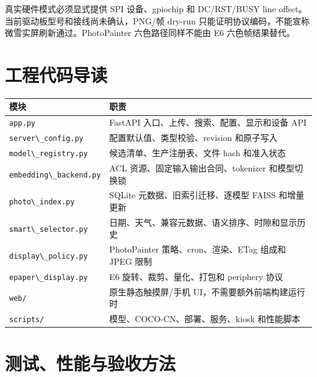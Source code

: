 真实硬件模式必须显式提供 SPI 设备、gpiochip 和 DC/RST/BUSY line
offset。当前驱动板型号和接线尚未确认，PNG/帧 dry-run
只能证明协议编码，不能宣称微雪实屏刷新通过。PhotoPainter
六色路径同样不能由 E6 六色帧结果替代。

\section{工程代码导读}\label{ux5de5ux7a0bux4ee3ux7801ux5bfcux8bfb}

\begin{longtable}[]{@{}
  >{\raggedright\arraybackslash}p{}
  >{\raggedright\arraybackslash}p{}@{}}
\toprule\noalign{}
\begin{minipage}[b]{\linewidth}\raggedright
模块
\end{minipage} & \begin{minipage}[b]{\linewidth}\raggedright
职责
\end{minipage} \\
\midrule\noalign{}
\endhead
\bottomrule\noalign{}
\endlastfoot
\passthrough{\lstinline!app.py!} & FastAPI
入口、上传、搜索、配置、显示和设备 API \\
\passthrough{\lstinline!server\_config.py!} &
配置默认值、类型校验、revision 和原子写入 \\
\passthrough{\lstinline!model\_registry.py!} &
候选清单、生产注册表、文件 hash 和准入状态 \\
\passthrough{\lstinline!embedding\_backend.py!} & ACL
资源、固定输入输出合同、tokenizer 和模型切换锁 \\
\passthrough{\lstinline!photo\_index.py!} & SQLite
元数据、旧索引迁移、逐模型 FAISS 和增量更新 \\
\passthrough{\lstinline!smart\_selector.py!} &
日期、天气、兼容元数据、语义排序、时隙和显示历史 \\
\passthrough{\lstinline!display\_policy.py!} & PhotoPainter
策略、cron、渲染、ETag 组成和 JPEG 限制 \\
\passthrough{\lstinline!epaper\_display.py!} & E6
旋转、裁剪、量化、打包和 periphery 协议 \\
\passthrough{\lstinline!web/!} & 原生静态触摸屏/手机
UI，不需要额外前端构建运行时 \\
\passthrough{\lstinline!scripts/!} & 模型、COCO-CN、部署、服务、kiosk
和性能脚本 \\
\end{longtable}

\section{测试、性能与验收方法}\label{ux6d4bux8bd5ux6027ux80fdux4e0eux9a8cux6536ux65b9ux6cd5}

